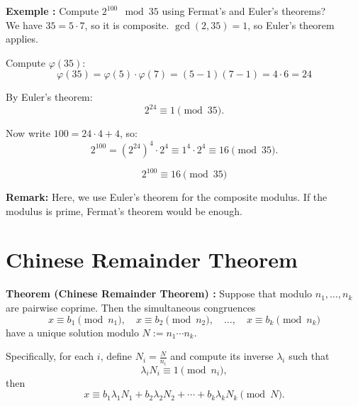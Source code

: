 \textbf{Exemple :}
 Compute $2^{100} \mod 35$ using Fermat's and Euler's theorems?\\

  
We have $35 = 5 \cdot 7$, so it is composite. $\gcd(2,35) = 1$, so Euler's theorem applies.  

Compute $\varphi(35)$:  
\[
\varphi(35) = \varphi(5) \cdot \varphi(7) = (5-1)(7-1) = 4 \cdot 6 = 24
\]  

By Euler's theorem:  
\[
2^{24} \equiv 1 \pmod{35}.
\]  

Now write $100 = 24 \cdot 4 + 4$, so:  
\[
2^{100} = (2^{24})^4 \cdot 2^4 \equiv 1^4 \cdot 2^4 \equiv 16 \pmod{35}.
\]  

 $$2^{100} \equiv 16 \pmod{35}$$

\textbf{Remark:} Here, we use Euler's theorem for the composite modulus. If the modulus is prime, Fermat's theorem would be enough.
\section{Chinese Remainder Theorem}

\textbf{Theorem (Chinese Remainder Theorem) :} Suppose that modulo $n_1, \dots, n_k$ are pairwise coprime. Then the simultaneous congruences
\[
x \equiv b_1 \pmod{n_1}, \quad x \equiv b_2 \pmod{n_2}, \quad \dots, \quad x \equiv b_k \pmod{n_k} 
\]
have a unique solution modulo $N := n_1 \cdots n_k$.

Specifically, for each $i$, define $N_i = \frac{N}{n_i}$ and compute its inverse $\lambda_i$ such that
\[
\lambda_i N_i \equiv 1 \pmod{n_i},
\]
then
\[
x \equiv b_1 \lambda_1 N_1 + b_2 \lambda_2 N_2 + \cdots + b_k \lambda_k N_k \pmod{N}.
\]

